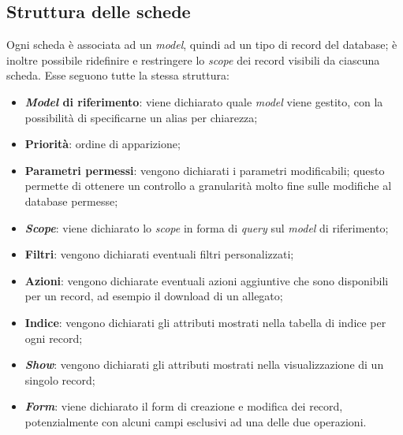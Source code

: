 \subsection{Struttura delle schede}
Ogni scheda è associata ad un \textit{model}, quindi ad un tipo di record del database; è inoltre possibile ridefinire e restringere lo \textit{scope} dei record visibili da ciascuna scheda.
Esse seguono tutte la stessa struttura:
\begin{itemize}
    \item \textbf{\textit{Model} di riferimento}: viene dichiarato quale \textit{model} viene gestito, con la possibilità di specificarne un alias per chiarezza;
    \item \textbf{Priorità}: ordine di apparizione;
    \item \textbf{Parametri permessi}: vengono dichiarati i parametri modificabili; questo permette di ottenere un controllo a granularità molto fine sulle modifiche al database permesse;
    \item \textbf{\textit{Scope}}: viene dichiarato lo \textit{scope} in forma di \textit{query} sul \textit{model} di riferimento;
    \item \textbf{Filtri}: vengono dichiarati eventuali filtri personalizzati;
    \item \textbf{Azioni}: vengono dichiarate eventuali azioni aggiuntive che sono disponibili per un record, ad esempio il download di un allegato;
    \item \textbf{Indice}: vengono dichiarati gli attributi mostrati nella tabella di indice per ogni record;
    \item \textbf{\textit{Show}}: vengono dichiarati gli attributi mostrati nella visualizzazione di un singolo record;
    \item \textbf{\textit{Form}}: viene dichiarato il form di creazione e modifica dei record, potenzialmente con alcuni campi esclusivi ad una delle due operazioni.
\end{itemize}
\vspace{-15pt}
